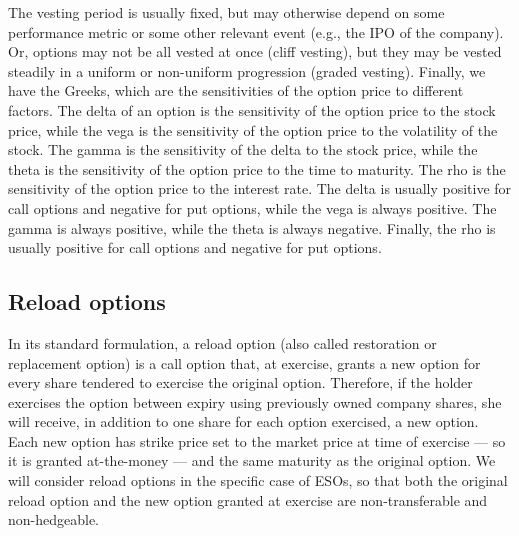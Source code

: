     

    The vesting period is usually fixed, but may otherwise depend on some performance metric or some other relevant event (e.g., the IPO of the company). Or, options may not be all vested at once (cliff vesting), but they may be vested steadily in a uniform or non-uniform progression (graded vesting).
    Finally, we have the Greeks, which are the sensitivities of the option price to different factors.
    The delta of an option is the sensitivity of the option price to the stock price, while the vega is the sensitivity of the option price to the volatility of the stock. The gamma is the sensitivity of the delta to the stock price, while the theta is the sensitivity of the option price to the time to maturity. The rho is the sensitivity of the option price to the interest rate. The delta is usually positive for call options and negative for put options, while the vega is always positive. The gamma is always positive, while the theta is always negative. Finally, the rho is usually positive for call options and negative for put options.

\subsection{Reload options} %
    In its standard formulation, a reload option (also called restoration or replacement option) is a call option that, at exercise, grants a new option for every share tendered to exercise the original option. Therefore, if the holder exercises the option between expiry using previously owned company shares, she will receive, in addition to one share for each option exercised, a new option. Each new option has strike price set to the market price at time of exercise --- so it is granted at-the-money --- and the same maturity as the original option. We will consider reload options in the specific case of ESOs, so that both the original reload option and the new option granted at exercise are non-transferable and non-hedgeable.    

